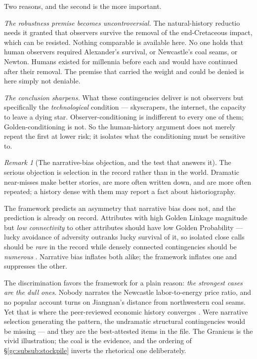 \documentclass[11pt]{article}
\numberwithin{equation}{section}
\theoremstyle{plain}
\theoremstyle{definition}
\theoremstyle{remark}
\newtheorem{remark}[theorem]{Remark}
\begin{document}
Two reasons, and the second is the more important.

\emph{The robustness premise becomes uncontroversial.} The natural-history
reductio needs it granted that observers survive the removal of the
end-Cretaceous impact, which can be resisted. Nothing comparable is
available here. No one holds that human observers required Alexander's
survival, or Newcastle's coal seams, or Newton. Humans existed for
millennia before each and would have continued after their removal. The
premise that carried the weight and could be denied is here simply not
deniable.

\emph{The conclusion sharpens.} What these contingencies deliver is not
observers but specifically the \emph{technological} condition ---
skyscrapers, the internet, the capacity to leave a dying star.
Observer-conditioning is indifferent to every one of them;
Golden-conditioning is not. So the human-history argument does not merely repeat
the first at lower risk; it isolates what the conditioning must be
sensitive to.

\begin{remark}[The narrative-bias objection, and the test that answers
it]\label{gc:rem:narrativebias}
The serious objection is selection in the record rather than in the
world. Dramatic near-misses make better stories, are more often written
down, and are more often repeated; a history dense with them may report
a fact about historiography.

The framework predicts an asymmetry that narrative bias does not, and
the prediction is already on record. Attributes with high Golden Linkage
magnitude but \emph{low connectivity} to other attributes should have
low Golden Probability --- lucky avoidance of adversity outranks lucky
survival of it, so isolated close calls should be \emph{rare} in the
record while densely connected contingencies should be
\emph{numerous} \cite{GoldenScience22}. Narrative bias inflates both
alike; the framework inflates one and suppresses the other.

The discrimination favors the framework for a plain reason: \emph{the strongest cases are the dull ones}. Nobody narrates
the Newcastle labor-to-energy price ratio, and no popular account turns
on Jiangnan's distance from northwestern coal seams. Yet that is where
the peer-reviewed economic history converges \cite{Pomeranz00,
Allen09}. Were narrative selection generating the pattern, the
undramatic structural contingencies would be missing --- and they are
the best-attested items in the file. The Granicus is the vivid
illustration; the coal is the evidence, and the ordering of
\S\ref{gc:subsub:stockpile} inverts the rhetorical one deliberately.
\end{remark}
\end{document}
